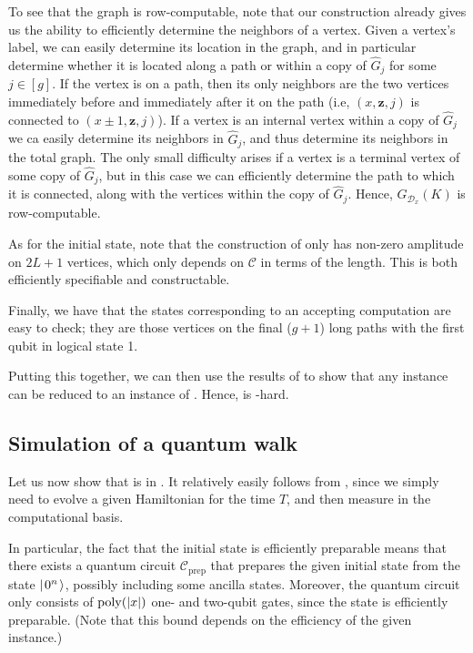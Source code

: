 \documentclass[../thesis-main/thesis-main]{subfiles}
\begin{document}
To see that the graph is row-computable, note that our construction already gives us the ability to efficiently determine the neighbors of a vertex.  Given a vertex's label, we can easily determine its location in the graph, and in particular determine whether it is located along a path or within a copy of $\widehat{G}_j$ for some $j\in[g]$.  If the vertex is on a path, then its only neighbors are the two vertices immediately before and immediately after it on the path (i.e, $(x,\mathbf{z},j)$ is connected to $(x\pm 1, \mathbf{z},j)$).  If a vertex is an internal vertex within a copy of $\widehat{G}_j$ we ca easily determine its neighbors in $\widehat{G}_j$, and thus determine its neighbors in the total graph.  The only small difficulty arises if a vertex is a terminal vertex of some copy of $\widehat{G}_j$, but in this case we can efficiently determine the path to which it is connected, along with the vertices within the copy of $\widehat{G}_j$.  Hence, $G_{\mathcal{D}_x}(K)$ is row-computable.

As for the initial state, note that the construction of  only has non-zero amplitude on $2L + 1$ vertices, which only depends on $\mathcal{C}$ in terms of the length.  This is both efficiently specifiable and constructable. 

Finally, we have that the states corresponding to an accepting computation are easy to check; they are those vertices on the final ($g+1$) long paths with the first qubit in logical state 1.

Putting this together, we can then use the results of  to show that any \QCircVer{} instance can be reduced to an instance of \QWE.  Hence, \QWE{}  is \BQP-hard.

\subsection{Simulation of a quantum walk}

Let us now show that \QWE{} is in \BQP.  It relatively easily follows from , since we simply need to evolve a given Hamiltonian for the time $T$, and then measure in the computational basis.

In particular, the fact that the initial state is efficiently preparable means that there exists a quantum circuit $\mathcal{C}_{\text{prep}}$ that prepares the given initial state from the state $|\mspace{2mu} 0^n \mspace{2mu} \rangle$, possibly including some ancilla states.  Moreover, the quantum circuit only consists of $\operatorname{poly}(|x|)$ one- and two-qubit gates, since the state is efficiently preparable.  (Note that this bound depends on the efficiency of the given instance.)
\end{document}
